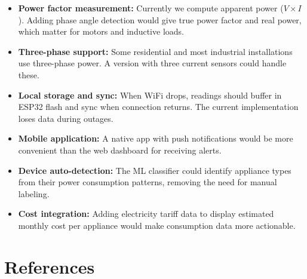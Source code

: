 \documentclass[12pt, a4paper]{article}
\begin{document}
	\begin{itemize}[itemsep=5pt, topsep=6pt]
		\item \textbf{Power factor measurement:} Currently we compute apparent power ($V \times I$). Adding phase angle detection would give true power factor and real power, which matter for motors and inductive loads.
		
		\item \textbf{Three-phase support:} Some residential and most industrial installations use three-phase power. A version with three current sensors could handle these.
		
		\item \textbf{Local storage and sync:} When WiFi drops, readings should buffer in ESP32 flash and sync when connection returns. The current implementation loses data during outages.
		
		\item \textbf{Mobile application:} A native app with push notifications would be more convenient than the web dashboard for receiving alerts.
		
		\item \textbf{Device auto-detection:} The ML classifier could identify appliance types from their power consumption patterns, removing the need for manual labeling.
		
		\item \textbf{Cost integration:} Adding electricity tariff data to display estimated monthly cost per appliance would make consumption data more actionable.
	\end{itemize}
	
	\newpage
	
	\section{References}
	
\end{document}
